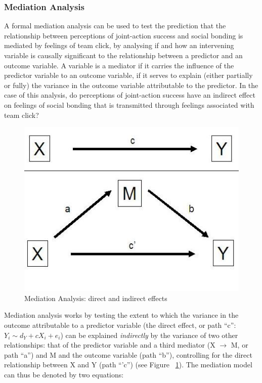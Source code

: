 \begin{CJK}{UTF8}{gbsn}




\subsubsection{Mediation Analysis\label{app8:mediationAnalysis}}
A formal mediation analysis can be used to test the prediction that the relationship between perceptions of joint-action success and social bonding is mediated by feelings of team click, by analysing if and how an intervening variable is causally significant to the relationship between a predictor and an outcome variable. A variable is a mediator if it carries the influence of the predictor variable to an outcome variable, if it serves to explain (either partially or fully) the variance in the outcome variable attributable to the predictor. In the case of this analysis, do perceptions of joint-action success have an indirect effect on feelings of social bonding that is transmitted through feelings associated with team click?

\begin{figure}[htbp]
  \begin{center}
    \includegraphics[scale = .5]{images/mediation_image.jpg}
    \caption{Mediation Analysis: direct and indirect effects}
    \label{fig:mediationAnalysis}
  \end{center}
\end{figure}

Mediation analysis works by testing the extent to which the variance in the outcome attributable to a predictor variable (the direct effect, or path ``c'': $Y_i \sim d_Y + cX_i + e_i$) can be explained \textit{indirectly} by the variance of two other relationships: that of the predictor variable and a third mediator (X $\rightarrow$ M, or path ``a'')  and M and the outcome variable (path ``b''), controlling for the direct relationship between X and Y (path ``'c'') (see Figure ~\ref{fig:mediationAnalysis}). The mediation model can thus be denoted by two equations:


\end{CJK}
